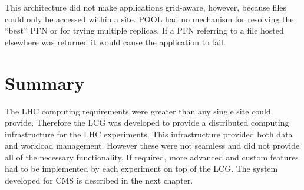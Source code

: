 This architecture did not make applications grid-aware, however, because files could only be accessed within a site. POOL had no mechanism for resolving the ``best'' PFN or for trying multiple replicas. If a PFN referring to a file hosted elsewhere was returned it would cause the application to fail.

\section{Summary}
The LHC computing requirements were greater than any single site could provide. Therefore the LCG was developed to provide a distributed computing infrastructure for the LHC experiments. This infrastructure provided both data and workload management. However these were not seamless and did not provide all of the necessary functionality. If required, more advanced and custom features had to be implemented by each experiment on top of the LCG. The system developed for CMS is described in the next chapter.